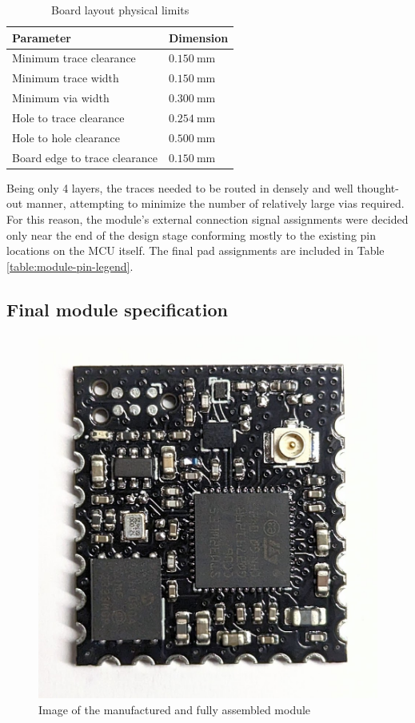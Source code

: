 \begin{table}[H]
\begin{center}
\caption{\label{table:board-limits}Board layout physical limits}
    \begin{tabular}{|l|l|} \hline
    \textbf{Parameter}          & \textbf{Dimension} \\ \hline
    Minimum trace clearance & $0.150~\mathrm{mm}$ \\ \hline
    Minimum trace width & $0.150~\mathrm{mm}$ \\ \hline
    Minimum via width & $0.300~\mathrm{mm}$ \\ \hline
    Hole to trace clearance & $0.254~\mathrm{mm}$ \\ \hline
    Hole to hole clearance & $0.500~\mathrm{mm}$ \\ \hline
    Board edge to trace clearance & $0.150~\mathrm{mm}$ \\ \hline
    \end{tabular}
\end{center}
\end{table}

Being only 4 layers, the traces needed to be routed in densely and well thought-out manner, attempting to minimize the number of relatively large vias required. For this reason, the module's external connection signal assignments were decided only near the end of the design stage conforming mostly to the existing pin locations on the MCU itself. The final pad assignments are included in Table \ref{table:module-pin-legend}.

\subsection{Final module specification}
\begin{figure}
    \includegraphics[width=.45\textwidth]{img/module-v0.1.jpg}
    \caption{\label{fig:module-v0.1}Image of the manufactured and fully assembled module}
\end{figure}

